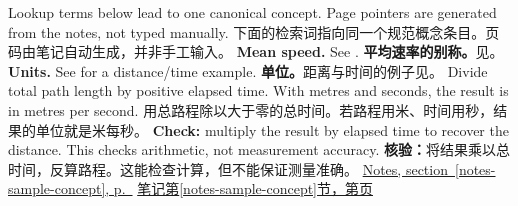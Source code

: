  {Lookup terms below lead to one canonical concept. Page pointers are generated from the notes, not typed manually.}
 {下面的检索词指向同一个规范概念条目。页码由笔记自动生成，并非手工输入。}
 {\textbf{Mean speed.} See .}
 {\textbf{平均速率的别称。}见。}
 {\textbf{Units.} See  for a distance/time example.}
 {\textbf{单位。}距离与时间的例子见。}
 {Divide total path length by positive elapsed time. With metres and seconds, the result is in metres per second.}
 {用总路程除以大于零的总时间。若路程用米、时间用秒，结果的单位就是米每秒。}
 {\textbf{Check:} multiply the result by elapsed time to recover the distance. This checks arithmetic, not measurement accuracy.}
 {\textbf{核验：}将结果乘以总时间，反算路程。这能检查计算，但不能保证测量准确。}
 {\hyperref[notes-sample-concept]{Notes, section~\ref*{notes-sample-concept}, p.~\pageref*{notes-sample-concept}}}
 {\hyperref[notes-sample-concept]{笔记第\ref*{notes-sample-concept}节，第\pageref*{notes-sample-concept}页}}
